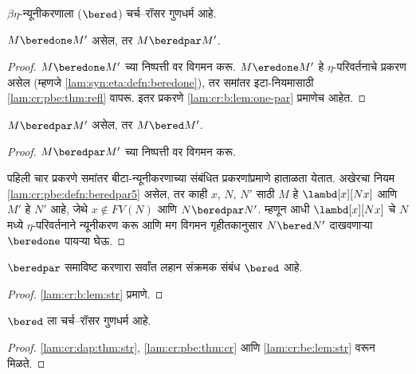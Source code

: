$\beta\eta$-न्यूनीकरणाला ($\bered$) चर्च–रॉसर
गुणधर्म आहे.

\begin{lem}\label{lam:cr:be:lem:one-par}
  $M \beredone M'$ असेल, तर $M \beredpar M'$.
\end{lem}

\begin{proof}
  $M \beredone M'$ च्या निष्पत्ती वर विगमन करू.
  $M \eredone M'$ हे $\eta$-परिवर्तनाचे प्रकरण
  असेल (म्हणजे \ref{lam:syn:eta:defn:beredone}),
  तर समांतर इटा-नियमासाठी \ref{lam:cr:pbe:thm:refl}
  वापरू. इतर प्रकरणे \ref{lam:cr:b:lem:one-par}
  प्रमाणेच आहेत.
\end{proof}

\begin{lem}\label{lam:cr:be:lem:par-red}
  $M \beredpar M'$ असेल, तर $M \bered M'$.
\end{lem}

\begin{proof} $M \beredpar M'$ च्या निष्पत्ती वर विगमन करू.

  पहिली चार प्रकरणे समांतर बीटा-न्यूनीकरणाच्या
  संबंधित प्रकरणांप्रमाणे हाताळता येतात. अखेरचा नियम
  \ref{lam:cr:pbe:defn:beredpar5} असेल, तर काही $x$, $N$,
  $N'$ साठी $M$ हे $\lambd[x][Nx]$ आणि $M'$ हे $N'$
  आहे, जेथे $x \notin FV(N)$ आणि $N \beredpar N'$.
  म्हणून आधी $\lambd[x][Nx]$ चे $N$ मध्ये
  $\eta$-परिवर्तनाने न्यूनीकरण करू आणि मग विगमन
  गृहीतकानुसार $N \bered N'$ दाखवणाऱ्या $\beredone$
  पायऱ्या घेऊ.
\end{proof}

\begin{lem}\label{lam:cr:be:lem:str}
  $\beredpar$ समाविष्ट करणारा सर्वांत लहान संक्रमक
  संबंध $\bered$ आहे.
\end{lem}

\begin{proof}
  \ref{lam:cr:b:lem:str} प्रमाणे.
\end{proof}

\begin{thm}\label{lam:cr:be:thm:cr}
  $\bered$ ला चर्च–रॉसर गुणधर्म आहे.
\end{thm}

\begin{proof}
  \ref{lam:cr:dap:thm:str}, \ref{lam:cr:pbe:thm:cr} आणि
  \ref{lam:cr:be:lem:str} वरून मिळते.
\end{proof}


